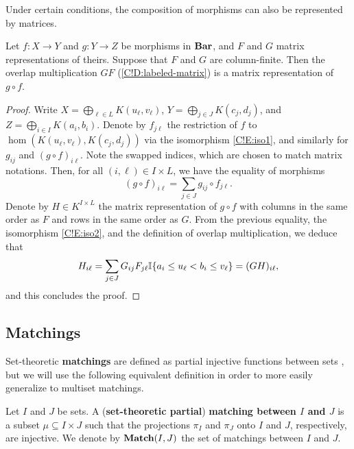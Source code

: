 Under certain conditions, the composition of morphisms can also be represented by matrices.

\begin{proposition}
\label{C!P:matrix-multiplication}
  Let $f \colon X \to Y$ and $g \colon Y \to Z$ be morphisms in $\Bar$, and $F$ and $G$ matrix representations of theirs. Suppose that $F$ and $G$ are column-finite. Then the overlap multiplication $GF$ (\cref{C!D:labeled-matrix}) is a matrix representation of $g \circ f$.
\end{proposition}

\begin{proof}
  Write $X = \bigoplus_{\ell \in L} K(u_\ell, v_\ell)$, $Y = \bigoplus_{j \in J} K(c_j, d_j)$, and $Z = \bigoplus_{i \in I} K(a_i, b_i)$. Denote by $f_{j\ell}$ the restriction of $f$ to $\hom(K(u_\ell, v_\ell), K(c_j, d_j))$ via the isomorphism \eqref{C!E:iso1}, and similarly for $g_{ij}$ and $(g \circ f)_{i\ell}$. Note the swapped indices, which are chosen to match matrix notations. Then, for all $(i, \ell) \in I \times L$, we have the equality of morphisms
  \[
    (g \circ f)_{i \ell} = \sum_{j \in J} g_{ij} \circ f_{j \ell}.
  \]
  Denote by $H \in K^{I \times L}$ the matrix representation of $g \circ f$ with columns in the same order as $F$ and rows in the same order as $G$. From the previous equality, the isomorphism \eqref{C!E:iso2}, and the definition of overlap multiplication, we deduce that
  \[
    H_{i \ell} = \sum_{j \in J} G_{ij} F_{j \ell} \bb{I}\{a_i \leq u_\ell < b_i \leq v_\ell \} = (GH)_{i \ell},
  \]
  and this concludes the proof.
\end{proof}

\subsection{Matchings}

Set-theoretic \textbf{matchings} are defined as partial injective functions between sets \cite{BauerLesnick2020}, but we will use the following equivalent definition in order to more easily generalize to multiset matchings.

\begin{definition}[Matchings]
  Let $I$ and $J$ be sets. A (\textbf{set-theoretic partial}) \textbf{matching between $I$ and $J$} is a subset $\mu \subseteq I \times J$ such that the projections $\pi_I$ and $\pi_J$ onto $I$ and $J$, respectively, are injective. We denote by $\Match(I, J)$ the set of matchings between $I$ and $J$.
\end{definition}

